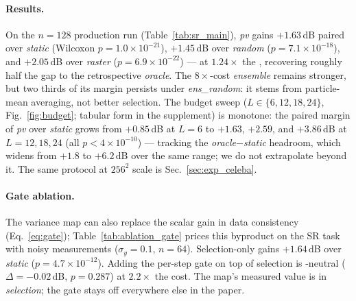 \paragraph{Results.} On the $n{=}128$ production run\RLOCAL{}
(Table~\ref{tab:sr_main}), \emph{pv} gains $+1.63$\,dB paired \psnrm{}
over \emph{static} (Wilcoxon $p{=}1.0{\times}10^{-21}$), $+1.45$\,dB
over \emph{random} ($p{=}7.1{\times}10^{-18}$), and $+2.05$\,dB over
\emph{raster} ($p{=}6.9{\times}10^{-22}$) --- at $1.24\times$ the \nfe,
recovering roughly half the gap to the retrospective \emph{oracle}. The
$8\times$-cost \emph{ensemble} remains stronger, but two thirds of its
margin persists under \emph{ens\_random}: it stems from particle-mean
averaging, not better selection. The budget sweep
($L\in\{6,12,18,24\}$, Fig.~\ref{fig:budget}; tabular form in the
supplement) is monotone: the paired margin of \emph{pv} over
\emph{static} grows from $+0.85$\,dB at $L{=}6$ to $+1.63$, $+2.59$,
and $+3.86$\,dB at $L{=}12,18,24$ (all
$p<4{\times}10^{-10}$)\RLOCAL{} --- tracking the
\emph{oracle}$-$\emph{static} headroom, which widens from $+1.8$ to
$+6.2$\,dB over the same range; we do not extrapolate beyond it. The
same protocol at $256^2$ scale is Sec.~\ref{sec:exp_celeba}.

\paragraph{Gate ablation.} The variance map can also replace the scalar
gain in data consistency (Eq.~\ref{eq:gate}); Table~\ref{tab:ablation_gate}
prices this byproduct on the SR task with noisy measurements
($\sigma_y{=}0.1$, $n{=}64$)\RLOCAL. Selection-only \pvas{} gains
$+1.64$\,dB over \emph{static} ($p{=}4.7{\times}10^{-12}$). Adding the
per-step gate on top of selection is \psnrm-neutral
($\Delta{=}{-}0.02$\,dB, $p{=}0.287$) at $2.2\times$ the cost. The
map's measured value is in \emph{selection}; the gate stays off
everywhere else in the paper.

